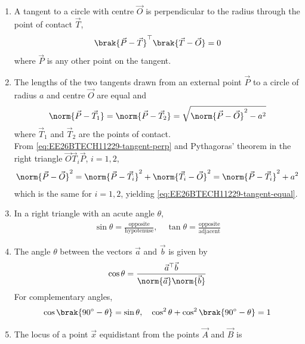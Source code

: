 \begin{enumerate}[label=\thesubsection.\arabic*, ref=\thesubsection.\theenumi]
\item A tangent to a circle with centre $\vec{O}$ is perpendicular to the radius through the point of contact $\vec{T}$,
\begin{align}
	\brak{\vec{P}-\vec{T}}^{\top}\brak{\vec{T}-\vec{O}} = 0
	\label{eq:EE26BTECH11229-tangent-perp}
\end{align}
where $\vec{P}$ is any other point on the tangent.
\item The lengths of the two tangents drawn from an external point $\vec{P}$ to a circle of radius $a$ and centre $\vec{O}$ are equal and
\begin{align}
	\norm{\vec{P}-\vec{T}_1} = \norm{\vec{P}-\vec{T}_2} = \sqrt{\norm{\vec{P}-\vec{O}}^2 - a^2}
	\label{eq:EE26BTECH11229-tangent-equal}
\end{align}
where $\vec{T}_1$ and $\vec{T}_2$ are the points of contact.
\\
\solution
From \eqref{eq:EE26BTECH11229-tangent-perp} and Pythagoras' theorem in the right triangle $\vec{O}\vec{T}_i\vec{P}$, $i=1,2$,
\begin{align}
	\norm{\vec{P}-\vec{O}}^2 = \norm{\vec{P}-\vec{T}_i}^2 + \norm{\vec{T}_i-\vec{O}}^2
	= \norm{\vec{P}-\vec{T}_i}^2 + a^2
\end{align}
which is the same for $i=1,2$, yielding \eqref{eq:EE26BTECH11229-tangent-equal}.
\item In a right triangle with an acute angle $\theta$,
\begin{align}
	\sin\theta = \frac{\text{opposite}}{\text{hypotenuse}}, \quad
	\tan\theta = \frac{\text{opposite}}{\text{adjacent}}
	\label{eq:EE26BTECH11229-trig}
\end{align}
\item The angle $\theta$ between the vectors $\vec{a}$ and $\vec{b}$ is given by
\begin{align}
	\cos\theta = \frac{\vec{a}^{\top}\vec{b}}{\norm{\vec{a}}\norm{\vec{b}}}
	\label{eq:EE26BTECH11229-angle-vec}
\end{align}
For complementary angles,
\begin{align}
	\cos\brak{90^{\circ}-\theta} = \sin\theta, \quad \cos^2\theta + \cos^2\brak{90^{\circ}-\theta} = 1
\end{align}
\item The locus of a point $\vec{x}$ equidistant from the points $\vec{A}$ and $\vec{B}$ is
\begin{align}

\end{align}
\end{enumerate}
